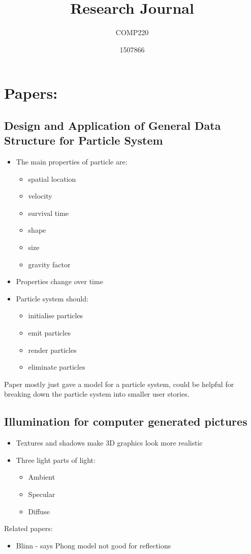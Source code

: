 \documentclass{scrartcl}
\title{Research Journal}
\subtitle{COMP220}
\author{1507866}
\begin{document}
	
\maketitle

	
\section{Papers:}
\subsection{Design and Application of General Data Structure for Particle System \cite{Huang}}
\begin{itemize}
	\item The main properties of particle are:
	\begin{itemize}
		\item spatial location
		\item velocity
		\item survival  time
		\item shape
		\item size
		\item gravity factor 
	\end{itemize}
	\item Properties change over time 
	\item Particle system should:
		\begin{itemize}
			\item initialise particles
			\item emit particles
			\item render particles
			\item eliminate particles 
		\end{itemize}
\end{itemize}

Paper mostly just gave a model for a particle system, could be helpful for breaking down the particle system into smaller user stories.


\subsection{Illumination for computer generated pictures \cite{Phong}}
\begin{itemize}
	\item Textures and shadows make 3D graphics look more realistic
	\item Three light parts of light:
	\begin{itemize}
		\item Ambient
		\item Specular
		\item Diffuse
	\end{itemize}
\end{itemize}
Related papers: \begin{itemize}
	\item Blinn \cite{Blinn} - says Phong model not good for reflections
\end{itemize}
\end{document}
